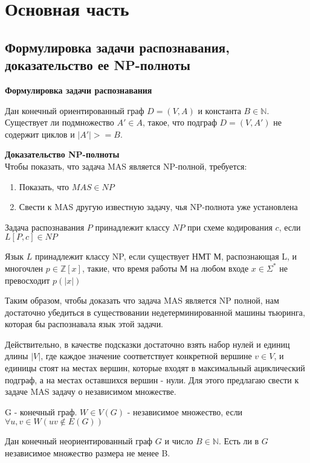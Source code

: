 
\section{Основная часть}
\subsection{Формулировка задачи распознавания, доказательство ее NP-полноты}

\textbf{Формулировка задачи распознавания} \\

\begin{problem}
    Дан конечный ориентированный граф $D = (V, A)$ и константа 
    $B \in \mathbb{N}$. Существует ли подмножество $A' \in A$, такое, что
    подграф $D = (V, A')$ не содержит циклов и $|A'| >= B$. 
\end{problem}

\textbf{Доказательство NP-полноты} \\

Чтобы показать, что задача MAS является NP-полной, требуется:

\begin{enumerate}
    \setlength{\itemindent}{1em}
    \item Показать, что $MAS \in NP$ \\
    \item Свести к MAS другую известную задачу, чья NP-полнота уже установлена 
\end{enumerate}

\begin{definition}
    Задача распознавания $P$ принадлежит классу $NP$ при схеме
    кодирования $c$, если $L\left[P, c\right] \in NP$
\end{definition}
\begin{definition}
    Язык $L$ принадлежит классу NP, если существует НМТ М, распознающая
    L, и многочлен $p \in \mathbb{Z}[x]$, такие, что время работы М
    на любом входе $x \in \Sigma^*$ не превосходит $p(|x|)$
\end{definition}
Таким образом, чтобы доказать что задача MAS является NP полной, нам 
достаточно убедиться в существовании недетерминированной машины 
тьюринга, которая бы распознавала язык этой задачи.

Действительно, в качестве подсказки достаточно взять набор нулей 
и единиц длины $|V|$, где каждое значение соответствует конкретной 
вершине $v \in V$, и единицы стоят на местах вершин, которые входят 
в максимальный ациклический подграф, а на местах оставшихся вершин - 
нули.
Для этого предлагаю свести к задаче MAS задачу о независимом множестве.
\begin{definition}
    G - конечный граф. $W \in V(G)$ - независимое множество, если \\
    $\forall u,v \in W (uv \notin E(G))$
\end{definition}
\begin{problem}
    Дан конечный неориентированный граф $G$ и число $B \in \mathbb{N}$.
    Есть ли в $G$ независимое множество размера не менее B.
\end{problem}

